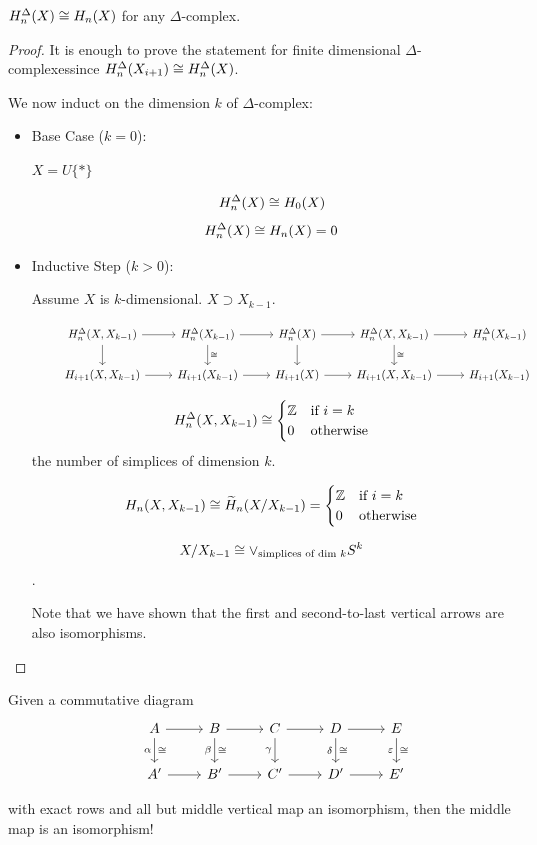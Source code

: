 \documentclass[11pt,leqno,oneside]{amsart}
\numberwithin{thm}{section}
\renewcommand{\epsilon}{\varepsilon}
\newcommand{\homl}[1][n]{H_{#1}}
\newcommand{\rhoml}[1][n]{\widetilde{H}_{#1}}
\newcommand{\dhoml}[1][n]{\homl^\Delta}
\newcommand{\Dcomplex}{$\Delta$-complex}
\newcommand{\Dcomplexes}{$\Delta$-complexes}
\begin{document}
\begin{thm}
  $\dhoml(X) \isom \homl(X)$ for any $\Delta$-complex.
\end{thm}
\begin{proof}
  It is enough to prove the statement for finite dimensional \Dcomplexes since $\dhoml(X_{i+1}) \isom \dhoml(X)$.

  We now induct on the dimension $k$ of \Dcomplex:
  \begin{itemize}
    \item Base Case ($k=0$):

    $X = U\{*\}$

    $$\dhoml[0](X) \isom \homl[0](X)$$
    $$\dhoml(X) \isom \homl(X) = 0$$

    \item Inductive Step ($k>0$):

    Assume $X$ is $k$-dimensional.  $X \supset X_{k-1}$.

    $$\begin{tikzcd}
      &\dhoml[i+1](X, X_{k-1}) \arrow[d] \arrow[r] &\dhoml[i+1](X_{k-1}) \arrow[d, "\isom"] \arrow[r] &\dhoml[i+1](X) \arrow[d] \arrow[r] &\dhoml[i+1](X, X_{k-1}) \arrow[d, "\isom"] \arrow[r] &\dhoml[i+1](X_{k-1}) \\
      &\homl[i+1](X, X_{k-1}) \arrow[r] &\homl[i+1](X_{k-1}) \arrow[r] &\homl[i+1](X) \arrow[r] &\homl[i+1](X, X_{k-1}) \arrow[r] &\homl[i+1](X_{k-1})
    \end{tikzcd}$$

    $$\dhoml(X, X_{k-1}) \isom \begin{cases}
      \Z &\text{if $i=k$} \\
      0 &\text{otherwise}
    \end{cases}$$ the number of simplices of dimension $k$.

    $$\homl(X, X_{k-1}) \isom \rhoml(X/X_{k-1}) = \begin{cases}
      \Z &\text{if $i=k$} \\
      0 &\text{otherwise}
    \end{cases}$$

    $$X/X_{k-1} \mathrel{\cong} \vee_{\text{simplices of dim $k$}} S^k$$.

    Note that we have shown that the first and second-to-last vertical arrows are also isomorphisms.
  \end{itemize}
\end{proof}
\begin{thm}[5-Lemma]
  Given a commutative diagram
  $$\begin{tikzcd}
    &A \arrow[d, "\isom", "\alpha"'] \arrow[r] &B \arrow[d, "\isom", "\beta"'] \arrow[r] &C \arrow[d, "\gamma"'] \arrow[r] &D \arrow[d, "\isom", "\delta"'] \arrow[r] &E \arrow[d, "\isom", "\epsilon"'] \\
    &A' \arrow[r] &B' \arrow[r] &C' \arrow[r] &D' \arrow[r] &E'
  \end{tikzcd}$$

  with exact rows and all but middle vertical map an isomorphism, then the middle map is an isomorphism!
\end{thm}
\end{document}
